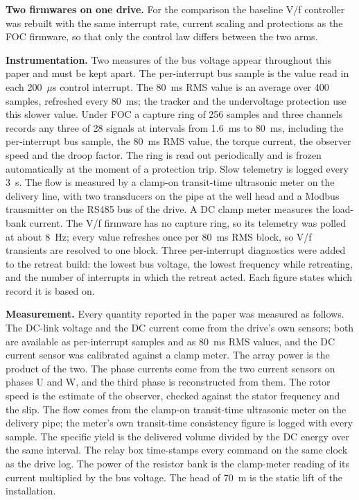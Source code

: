 \documentclass[journal]{IEEEtran}
\begin{document}
\textbf{Two firmwares on one drive.} For the comparison the baseline V/f controller was rebuilt with the same interrupt rate, current scaling and protections as the FOC firmware, so that only the control law differs between the two arms.

\textbf{Instrumentation.} Two measures of the bus voltage appear throughout this paper and must be kept apart. The per-interrupt bus sample is the value read in each 200~$\mu$s control interrupt. The 80~ms RMS value is an average over 400 samples, refreshed every 80~ms; the tracker and the undervoltage protection use this slower value. Under FOC a capture ring of 256 samples and three channels records any three of 28 signals at intervals from 1.6~ms to 80~ms, including the per-interrupt bus sample, the 80~ms RMS value, the torque current, the observer speed and the droop factor. The ring is read out periodically and is frozen automatically at the moment of a protection trip. Slow telemetry is logged every 3~s. The flow is measured by a clamp-on transit-time ultrasonic meter on the delivery line, with two transducers on the pipe at the well head and a Modbus transmitter on the RS485 bus of the drive. A DC clamp meter measures the load-bank current. The V/f firmware has no capture ring, so its telemetry was polled at about 8~Hz; every value refreshes once per 80~ms RMS block, so V/f transients are resolved to one block. Three per-interrupt diagnostics were added to the retreat build: the lowest bus voltage, the lowest frequency while retreating, and the number of interrupts in which the retreat acted. Each figure states which record it is based on.

\textbf{Measurement.} Every quantity reported in the paper was measured as follows. The DC-link voltage and the DC current come from the drive's own sensors; both are available as per-interrupt samples and as 80~ms RMS values, and the DC current sensor was calibrated against a clamp meter. The array power is the product of the two. The phase currents come from the two current sensors on phases U and W, and the third phase is reconstructed from them. The rotor speed is the estimate of the observer, checked against the stator frequency and the slip. The flow comes from the clamp-on transit-time ultrasonic meter on the delivery pipe; the meter's own transit-time consistency figure is logged with every sample. The specific yield is the delivered volume divided by the DC energy over the same interval. The relay box time-stamps every command on the same clock as the drive log. The power of the resistor bank is the clamp-meter reading of its current multiplied by the bus voltage. The head of 70~m is the static lift of the installation.
\end{document}
